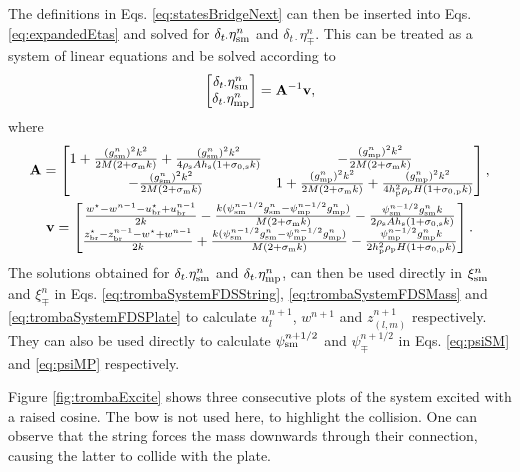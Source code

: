 The definitions in Eqs. \eqref{eq:statesBridgeNext} can then be inserted into Eqs. \eqref{eq:expandedEtas} and solved for $\delta_{t\cdot}\eta_{\text{sm}}^n$ and $\delta_{t\cdot}\eta_\mp^n$. This can be treated as a system of linear equations and be solved according to
\begin{equation}
    \begin{bmatrix}
        \delta_{t\cdot}\eta_{\text{sm}}^n\\
        \delta_{t\cdot}\eta_{\text{mp}}^n
    \end{bmatrix}
    = 
    \mathbf{A}^{-1}\mathbf{v},
\end{equation}
where
\begin{equation}
\begin{gathered}
\mathbf{A} = 
    \begin{bmatrix}
        1 + \frac{(g_{\text{sm}}^n)^2k^2}{2M(2+\sigma_\text{m}k)} + \frac{(g_{\text{sm}}^n)^2k^2}{4\rho_\text{s}Ah_\text{s}(1+\sigma_{0,\text{s}}k)} & -\frac{(g_{\text{mp}}^n)^2k^2}{2M(2+\sigma_\text{m}k)} \\
        -\frac{(g_{\text{sm}}^n)^2k^2}{2M(2+\sigma_\text{m}k)} & 1+\frac{(g_{\text{mp}}^n)^2k^2}{2M(2+\sigma_\text{m}k)}+\frac{(g_{\text{mp}}^n)^2k^2}{4h_\text{p}^2\rho_\text{p}H(1+\sigma_{0,\text{p}}k)}
    \end{bmatrix}
    ,\\
    \mathbf{v} = 
    \begin{bmatrix}
        \frac{w^\star-w^{n-1}-u_\text{br}^\star+u_\text{br}^{n-1}}{2k} - \frac{k(\psi_{\text{sm}}^{n-1/2}g_{\text{sm}}^n-\psi_{\text{mp}}^{n-1/2}g_{\text{mp}}^n)}{M(2+\sigma_\text{m}k)}-\frac{\psi_{\text{sm}}^{n-1/2}g_{\text{sm}}^nk}{2\rho_\text{s}Ah_\text{s}(1+\sigma_{0,\text{s}}k)}\\
        \frac{z_\text{br}^\star-z_\text{br}^{n-1}-w^\star+w^{n-1}}{2k}+\frac{k(\psi_{\text{sm}}^{n-1/2}g_{\text{sm}}^n-\psi_{\text{mp}}^{n-1/2}g_{\text{mp}}^n)}{M(2+\sigma_\text{m}k)}-\frac{\psi_{\text{mp}}^{n-1/2}g_{\text{mp}}^nk}{2h_\text{p}^2\rho_\text{p}H(1+\sigma_{0,\text{p}}k)}
    \end{bmatrix}.
    \nonumber
\end{gathered}
\end{equation}
The solutions obtained for $\delta_{t\cdot} \eta_{\text{sm}}^n$ and $\delta_{t\cdot} \eta_{\text{mp}}^n$, can then be used directly in $\xi_{\text{sm}}^n$ and $\xi_\mp^n$ in Eqs. \eqref{eq:trombaSystemFDSString}, \eqref{eq:trombaSystemFDSMass} and \eqref{eq:trombaSystemFDSPlate} to calculate $u_l^{n+1}$, $w^{n+1}$ and $z_{(l,m)}^{n+1}$ respectively. They can also be used directly to calculate $\psi^{n+1/2}_{\text{sm}}$ and $\psi^{n+1/2}_\mp$ in Eqs. \eqref{eq:psiSM} and \eqref{eq:psiMP} respectively.

Figure \ref{fig:trombaExcite} shows three consecutive plots of the system excited with a raised cosine. The bow is not used here, to highlight the collision. One can observe that the string forces the mass downwards through their connection, causing the latter to collide with the plate.

